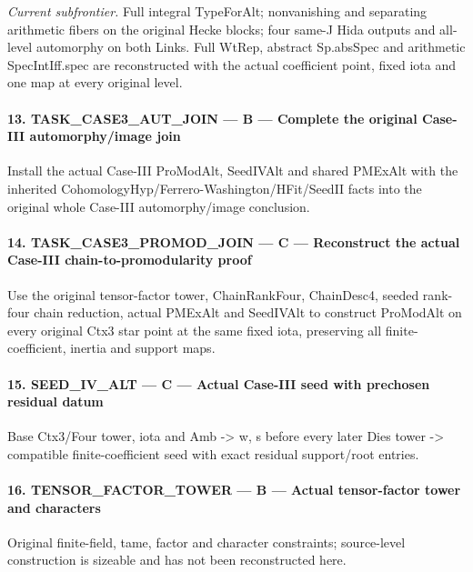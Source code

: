 \documentclass[11pt,a4paper]{article}
\numberwithin{equation}{section}
\theoremstyle{remark}\newtheorem{remark}[theorem]{Remark}
\begin{document}
\emph{Current subfrontier.} Full integral TypeForAlt; nonvanishing and separating arithmetic fibers on the original Hecke blocks; four same-J Hida outputs and all-level automorphy on both Links. Full WtRep, abstract Sp.absSpec and arithmetic SpecIntIff.spec are reconstructed with the actual coefficient point, fixed iota and one map at every original level.


\paragraph{13. TASK\_\allowbreak{}CASE3\_\allowbreak{}AUT\_\allowbreak{}JOIN — B — Complete the original Case-III automorphy/\allowbreak{}image join}

Install the actual Case-III ProModAlt, SeedIVAlt and shared PMExAlt with the inherited CohomologyHyp/\allowbreak{}Ferrero-Washington/\allowbreak{}HFit/\allowbreak{}SeedII facts into the original whole Case-III automorphy/\allowbreak{}image conclusion.


\paragraph{14. TASK\_\allowbreak{}CASE3\_\allowbreak{}PROMOD\_\allowbreak{}JOIN — C — Reconstruct the actual Case-III chain-to-promodularity proof}

Use the original tensor-factor tower, ChainRankFour, ChainDesc4, seeded rank-four chain reduction, actual PMExAlt and SeedIVAlt to construct ProModAlt on every original Ctx3 star point at the same fixed iota, preserving all finite-coefficient, inertia and support maps.


\paragraph{15. SEED\_\allowbreak{}IV\_\allowbreak{}ALT — C — Actual Case-III seed with prechosen residual datum}

Base Ctx3/\allowbreak{}Four tower, iota and Amb -> w,\allowbreak{} s before every later Dies tower -> compatible finite-coefficient seed with exact residual support/\allowbreak{}root entries.


\paragraph{16. TENSOR\_\allowbreak{}FACTOR\_\allowbreak{}TOWER — B — Actual tensor-factor tower and characters}

Original finite-field, tame, factor and character constraints; source-level construction is sizeable and has not been reconstructed here.
\end{document}
